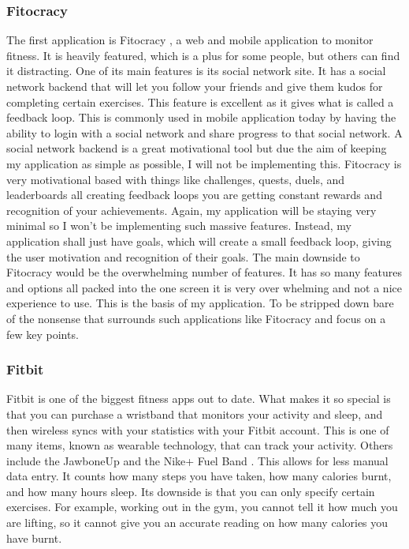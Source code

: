 \subsubsection{Fitocracy}
The first application is Fitocracy \citep{fitocracy:2007}, a web and mobile application to monitor fitness. It is heavily featured, which is a plus for some people, but others can find it distracting. One of its main features is its social network site. It has a social network backend that will let you follow your friends and give them kudos for completing certain exercises. This feature is excellent as it gives what is called a feedback loop. This is commonly used in mobile application today by having the ability to login with a social network and share progress to that social network. A social network backend is a great motivational tool but due the aim of keeping my application as simple as possible, I will not be implementing this. Fitocracy is very motivational based with things like challenges, quests, duels, and leaderboards all creating feedback loops you are getting constant rewards and recognition of your achievements. Again, my application will be staying very minimal so I won’t be implementing such massive features. Instead, my application shall just have goals, which will create a small feedback loop, giving the user motivation and recognition of their goals. The main downside to Fitocracy would be the overwhelming number of features. It has so many features and options all packed into the one screen it is very over whelming and not a nice experience to use. This is the basis of my application. To be stripped down bare of the nonsense that surrounds such applications like Fitocracy and focus on a few key points.


\subsubsection{Fitbit}
Fitbit is one of the biggest fitness apps out to date. What makes it so special is that you can purchase a wristband that monitors your activity and sleep, and then wireless syncs with your statistics with your Fitbit account. This is one of many items, known as wearable technology, that can track your activity. Others include the JawboneUp \citep{jawbone:2011} and the Nike+ Fuel Band \citep{nikefuelband:2012}. This allows for less manual data entry. It counts how many steps you have taken, how many calories burnt, and how many hours sleep. Its downside is that you can only specify certain exercises. For example, working out in the gym, you cannot tell it how much you are lifting, so it cannot give you an accurate reading on how many calories you have burnt.

